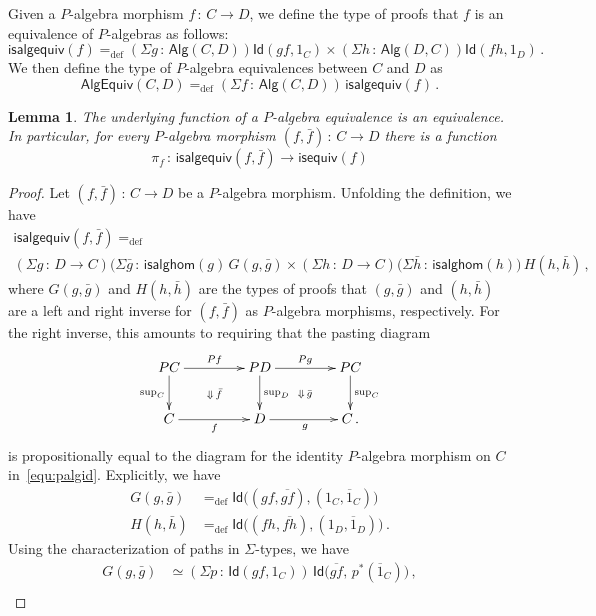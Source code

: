 \documentclass[10pt,a4paper,oneside,reqno]{amsart}
\numberwithin{equation}{section}
\theoremstyle{mythm}
\newtheorem{lemma}[theorem]{Lemma}
\theoremstyle{mydef}
\theoremstyle{myrmk}
\newcommand{\defeq}{=_{\mathrm{def}}}
\newcommand{\co}{\,{:}\,}
\newcommand{\Id}{\mathsf{Id}}
\newcommand{\Palg}{\mathsf{Alg}}
\renewcommand{\sup}{\mathrm{sup}}
\newcommand{\isalgequiv}{\mathsf{isalgequiv}}
\newcommand{\AlgEquiv}{\mathsf{AlgEquiv}}
\begin{document}
Given a $P$-algebra morphism $f \co C \to D$, we define the type of proofs that $f$ is an equivalence of $P$-algebras as follows:
\[
\isalgequiv(f) \defeq  (\Sigma g \co  \Palg(C,D)) \Id( g f, 1_C )  \times 
    (\Sigma h  \co \Palg(D, C)) \Id( f h , 1_D ) \, .
\]
We then define the type of $P$-algebra equivalences between $C$ and $D$ as
\[
\AlgEquiv(C, D)
\defeq   (\Sigma f \co \Palg(C,D)) \, \isalgequiv(f)  \, . 
\] 


\begin{lemma} The underlying function of a $P$-algebra equivalence is an equivalence. In particular, 
for every $P$-algebra morphism $(f, \bar{f}) \co C \to D$ there is a function 
\[
\pi_f \co \isalgequiv(f, \bar{f})  \to \mathsf{isequiv}(f)  
\]
\end{lemma}

\begin{proof} Let $(f, \bar{f}) \co C \to D$ be a $P$-algebra morphism. 
Unfolding the definition, we have
\begin{multline*}
\isalgequiv(f, \bar{f}) \defeq \\	 (\Sigma g \co D \to C) 
	 \big( \Sigma \bar{g} \co \mathsf{isalghom}(g) \, 
 		G(g, \bar{g})  \times
	 (\Sigma h \co D \to C) 
	 \big(\Sigma \bar{h} \co   \mathsf{isalghom}(h) )
	 \,  H(h, \bar{h}) \, , 
\end{multline*}
where 
$G(g, \bar{g})$ and $H(h, \bar{h})$ are the types of proofs that $(g, \bar{g})$ and $(h, \bar{h})$ are a left and right inverse for $(f, \bar{f})$ as 
$P$-algebra morphisms, respectively. For the right inverse, this amounts to requiring that the pasting diagram
\[
\xymatrix@C=1.5cm{
PC \ar[r]^{Pf} \ar[d]_{\sup_C} \ar@{}[dr]|{\Downarrow \, \bar{f}}  & PD \ar[r]^{Pg} \ar[d]^{\sup_D} 
\ar@{}[dr]|{\Downarrow \, \bar{g}}  & PC \ar[d]^{\sup_C}  \\
C \ar[r]_{f}   & D  \ar[r]_g & C \, .}
\]
is propositionally equal to the diagram for the identity $P$-algebra morphism on $C$ in~\eqref{equ:palgid}. 
Explicitly, we have
\begin{align*}
G(g,\bar{g}) & 
\defeq 
\Id \big( ( g  f,  \overline{gf}), (1_C, \overline{1}_C) \big)  \\
H(h,\bar{h})    & \defeq \Id \big( (   f h,  \overline{ f h}), (1_D, \overline{1}_D) \big)  \, .
\end{align*}
Using the characterization of paths in $\Sigma$-types, we have
\begin{align*}
G(g, \bar{g}) & \simeq (\Sigma p \co \Id(g f ,  1_C) ) \, 
	\Id\big( \overline{gf}   ,\, p^*( \overline{1}_C)  \big) \, , \\

\end{align*}
\end{proof}
\end{document}
